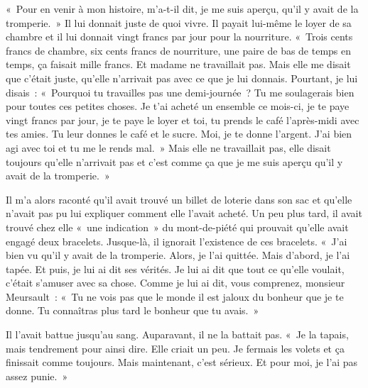 \documentclass[french,twoside]{book} %
\begin{document}
« Pour en venir à mon histoire, m’a-t-il dit, je me suis aperçu, qu’il y avait de la tromperie. » Il lui donnait juste de quoi vivre. Il payait lui-même le loyer de sa chambre et il lui donnait vingt francs par jour pour la nourriture. « Trois cents francs de chambre, six cents francs de nourriture, une paire de bas de temps en temps, ça faisait mille francs. Et madame ne travaillait pas. Mais elle me disait que c’était juste, qu’elle n’arrivait pas avec ce que je lui donnais. Pourtant, je lui disais : « Pourquoi tu travailles pas une demi-journée ? Tu me soulagerais bien pour toutes ces petites choses. Je t’ai acheté un ensemble ce mois-ci, je te paye vingt francs par jour, je te paye le loyer et toi, tu prends le café l’après-midi avec tes amies. Tu leur donnes le café et le sucre. Moi, je te donne l’argent. J'ai bien agi avec toi et tu me le rends mal. » Mais elle ne travaillait pas, elle disait toujours qu’elle n’arrivait pas et c’est comme ça que je me suis aperçu qu’il y avait de la tromperie. »\par
Il m’a alors raconté qu’il avait trouvé un billet de loterie dans son sac et qu’elle n’avait pas pu lui expliquer comment elle l’avait acheté. Un peu plus tard, il avait trouvé chez elle « une indication » du mont-de-piété qui prouvait qu’elle avait engagé deux bracelets. Jusque-là, il ignorait l’existence de ces bracelets. « J'ai bien vu qu’il y avait de la tromperie. Alors, je l’ai quittée. Mais d’abord, je l’ai tapée. Et puis, je lui ai dit ses vérités. Je lui ai dit que tout ce qu’elle voulait, c’était s’amuser avec sa chose. Comme je lui ai dit, vous comprenez, monsieur Meursault : « Tu ne vois pas que le monde il est jaloux du bonheur que je te donne. Tu connaîtras plus tard le bonheur que tu avais. »\par
Il l’avait battue jusqu’au sang. Auparavant, il ne la battait pas. « Je la tapais, mais tendrement pour ainsi dire. Elle criait un peu. Je fermais les volets et ça finissait comme toujours. Mais maintenant, c’est sérieux. Et pour moi, je l’ai pas assez punie. »\par
\end{document}
